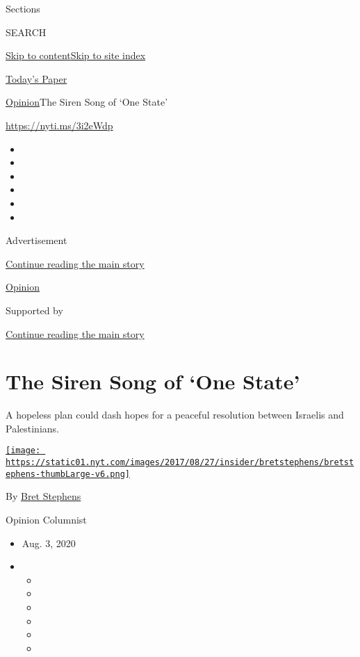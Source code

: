 Sections

SEARCH

\protect\hyperlink{site-content}{Skip to
content}\protect\hyperlink{site-index}{Skip to site index}

\href{https://myaccount.nytimes.com/auth/login?response_type=cookie\&client_id=vi}{}

\href{https://www.nytimes.com/section/todayspaper}{Today's Paper}

\href{/section/opinion}{Opinion}\textbar{}The Siren Song of `One State'

\url{https://nyti.ms/3i2eWdp}

\begin{itemize}
\item
\item
\item
\item
\item
\item
\end{itemize}

Advertisement

\protect\hyperlink{after-top}{Continue reading the main story}

\href{/section/opinion}{Opinion}

Supported by

\protect\hyperlink{after-sponsor}{Continue reading the main story}

\hypertarget{the-siren-song-of-one-state}{%
\section{The Siren Song of `One
State'}\label{the-siren-song-of-one-state}}

A hopeless plan could dash hopes for a peaceful resolution between
Israelis and Palestinians.

\href{https://www.nytimes.com/by/bret-stephens}{\texttt{[image: https://static01.nyt.com/images/2017/08/27/insider/bretstephens/bretstephens-thumbLarge-v6.png]}}

By \href{https://www.nytimes.com/by/bret-stephens}{Bret Stephens}

Opinion Columnist

\begin{itemize}
\item
  Aug. 3, 2020
\item
  \begin{itemize}
  \item
  \item
  \item
  \item
  \item
  \item
  \end{itemize}
\end{itemize}


